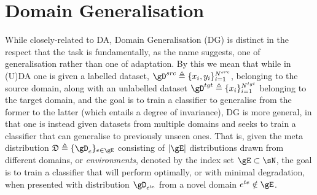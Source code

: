 \section{Domain Generalisation}\label{sec:domain_generalisation}
While closely-related to DA, Domain Generalisation (DG) is distinct in the respect that the task is
fundamentally, as the name suggests, one of \ood{} generalisation rather than one of adaptation.
%
By this we mean that while in (U)DA one is given a labelled dataset, \( \gD^{src} \triangleq
\{x_i, y_i \}_{i=1}^{N^{src}} \), belonging to the source domain, along with an unlabelled
dataset \( \gD^{tgt} \triangleq \{ x_i \}_{i=1}^{N^{tgt}} \) belonging to the target domain,
and the goal is to train a classifier to generalise from the former to the latter (which entails a
degree of invariance), DG is more general, in that one is instead given datasets from multiple
domains and seeks to train a classifier that can generalise to previously unseen ones. 
%
That is, given the meta distribution \( \mathfrak{D} \triangleq \{\gD_e \}_{e \in \gE} \) consisting of
\( |\gE| \) distributions drawn from different domains, or \emph{environments}, denoted by the
index set \( \gE \subset \sN \), the goal is to train a classifier that will perform optimally, or
with minimal degradation, when presented with distribution \( \gD_{e^{te}} \) from a novel
domain \( e^{te} \notin  \gE \).

